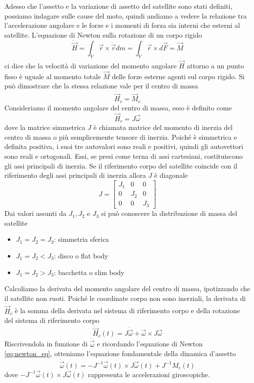 Adesso che l'assetto e la variazione di assetto del satellite sono stati
definiti, possiamo indagare sulle cause del moto, quindi andiamo a vedere la
relazione tra l'accelerazione angolare e le forze e i momenti di
forza sia interni che esterni al satellite.
L'equazione di Newton sulla rotazione di un corpo rigido
\begin{equation}
\dot{\vec{H}}=\int_V\vec{r}\times\ddot{\vec{r}}dm=\int_V\vec{r}\times
d\vec{F}=
\vec{M}
\label{eq:newton_eq}
\end{equation} 
ci dice che la velocità di variazione del momento angolare $\dot{\vec{H}}$
attorno a un punto fisso è uguale al momento totale $\vec{M}$ delle forze esterne agenti
sul corpo rigido. Si può dimostrare che la stessa relazione vale per il centro
di massa
\begin{equation}
\dot{\vec{H}}_c=\vec{M}_c
\end{equation}
Consideriamo il momento angolare del centro di massa, esso è definito come
\begin{equation}
\vec{H}_c=J\vec{\omega}
\end{equation}
dove la matrice simmetrica $J$ è chiamata matrice del momento di inerzia del
centro di massa o più semplicemente tensore di inerzia.
Poiché è simmetrica e definita positiva, i suoi tre autovalori sono reali e
positivi, quindi gli autovettori sono reali e ortogonali. Essi, se presi come
terna di assi cartesiani, costituiscono gli assi principali di inerzia. Se il
riferimento corpo del satellite coincide con il riferimento degli assi
principali di inerzia allora $J$ è diagonale
\begin{equation}
J=\begin{bmatrix}
J_1 & 0 & 0\\0 & J_2 & 0\\0 & 0 & J_3
\end{bmatrix}
\end{equation}
Dai valori assunti da $J_1, J_2$ e $J_3$ si può conoscere la distribuzione di
massa del satellite
\begin{itemize}
  \item $J_1=J_2=J_3$: simmetria sferica
  \item $J_1=J_2<J_3$: disco o flat body
  \item $J_1=J_2>J_3$: bacchetta o slim body
\end{itemize}
Calcoliamo la derivata del momento angolare del centro di massa, ipotizzando che
il satellite non ruoti. Poiché le coordinate corpo non sono inerziali, la
derivata di $\dot{\vec{H}}_c$ è la somma della derivata nel sistema di
riferimento corpo e della rotazione del sistema di riferimento corpo
\begin{equation}
\dot{\vec{H}}_c(t)=J\dot{\vec{\omega}}+\vec{\omega}\times J\vec{\omega}
\end{equation}
Riscrivendola in funzione di $\dot{\vec{\omega}}$ e ricordando
l'equazione di Newton \ref{eq:newton_eq}, otteniamo l'equazione fondamentale
della dinamica d'assetto
\begin{equation}
\dot{\vec{\omega}}(t)=-J^{-1}\vec{\omega}(t)\times J\vec{\omega}(t)+J^{-1}M_c(t)
\end{equation}
dove $-J^{-1}\vec{\omega}(t)\times J\vec{\omega}(t)$ rappresenta le
accelerazioni giroscopiche.

